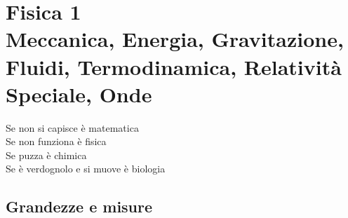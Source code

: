 \part[Fisica 1]{Fisica 1\\\vspace{1cm}\large{Meccanica, Energia, Gravitazione, Fluidi, Termodinamica, Relatività Speciale, Onde}}
\parttoc
\mtcskip


\begin{savequote}
Se non si capisce è matematica\\
Se non funziona è fisica\\
Se puzza è chimica\\
Se è verdognolo e si muove è biologia\\
\end{savequote}
\chapter{Grandezze e misure}
\minitoc
